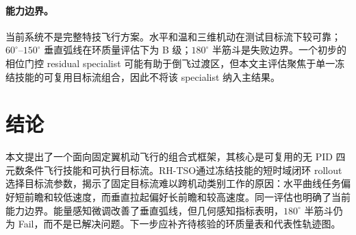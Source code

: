 \documentclass{article}
\newcommand{\rhtso}{RH-TSO}
\begin{document}
\paragraph{能力边界。}
当前系统不是完整特技飞行方案。水平和温和三维机动在测试目标流下较可靠；$60^\circ$--$150^\circ$ 垂直弧线在环质量评估下为 B 级；$180^\circ$ 半筋斗是失败边界。一个初步的相位门控 residual specialist 可能有助于倒飞过渡区，但本文主评估聚焦于单一冻结技能的可复用目标流组合，因此不将该 specialist 纳入主结果。


\section{结论}

本文提出了一个面向固定翼机动飞行的组合式框架，其核心是可复用的无 PID 四元数条件飞行技能和可执行目标流。\rhtso 通过冻结技能的短时域闭环 rollout 选择目标流参数，揭示了固定目标流难以跨机动类别工作的原因：水平曲线任务偏好短前瞻和较低速度，而垂直拉起偏好长前瞻和较高速度。同一评估也明确了当前能力边界。能量感知微调改善了垂直弧线，但几何感知指标表明，$180^\circ$ 半筋斗仍为 Fail，而不是已解决问题。下一步应补齐待核验的环质量表和代表性轨迹图。



\end{document}
